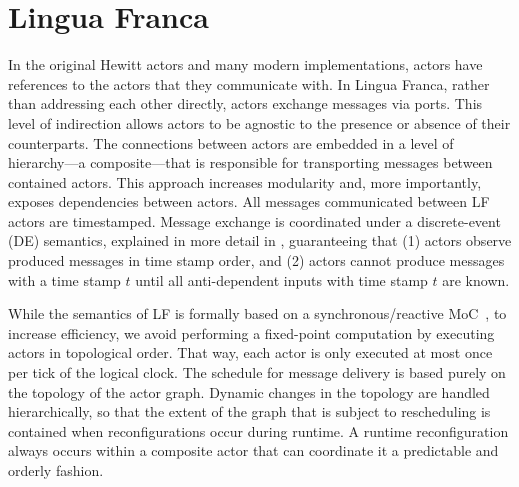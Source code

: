 \documentclass[sigconf]{acmart}
\newcommand{\marten}[1]{\mynote{Marten}{#1}{cyan}}%
\begin{document}
\section{Lingua Franca}
In the original Hewitt actors and many modern implementations, actors have references to the actors that they communicate with.
In Lingua Franca, rather than addressing each other directly, actors exchange messages via ports. This level of indirection allows actors to be agnostic to the presence or absence of their counterparts. The connections between actors are embedded in a level of hierarchy---a composite---that is responsible for transporting messages between contained actors. This approach increases modularity and, more importantly, exposes dependencies between actors.
All messages communicated between LF actors are timestamped. Message exchange is coordinated under a discrete-event (DE) semantics, explained in more detail in \cite{LeeEtAl:7:DiscreteEvents}, guaranteeing that (1) actors observe produced messages in time stamp order, and (2) actors cannot produce messages with a time stamp $t$ until all anti-dependent inputs with time stamp $t$ are known. 

While the semantics of LF is formally based on a synchronous/reactive MoC~\cite{LeeZheng:07:SRDECT}, to increase efficiency, we avoid performing a fixed-point computation by executing actors in topological order. That way, each actor is only executed at most once per tick of the logical clock. The schedule for message delivery is based purely on the topology of the actor graph.
Dynamic changes in the topology are handled hierarchically, so that the extent of the graph that is subject to rescheduling is contained when reconfigurations occur during runtime. A runtime reconfiguration always occurs within a composite actor that can coordinate it a predictable and orderly fashion. %
\end{document}
